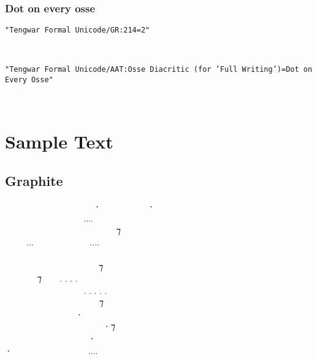 \documentclass[11pt,a4paper]{article}
\begin{document}
\formalAATosseambiguous  



\subsubsection*{Dot on every osse}


\texttt{"Tengwar Formal Unicode/GR:214=2"}

\formalGRosseevery  

\noindent \texttt{"Tengwar Formal Unicode/AAT:Osse Diacritic (for 'Full Writing')=Dot on Every Osse"}

\formalAATosseevery  



\newpage



\section{Sample Text}


\subsection{Graphite}
\formalGR
  ‍   ⸱‍  ‍ ⸱ \\
    ‍....  ‍  \\
  ‍   ‍ ‍ ⁊ ‍  \\
...  ....   \\
         ‍ \\
 ‍ ‍‍   ⁊  ‍ ‍ \\
 ‍ ⁊  . . . .  ‍ ‍‍   \\
   ‍ . . . . . ‍ ‍   \\
      ⁊    \\
   ‍⸱‍   ‍  \\
     ‍⸱ ⁊  ‍ \\
    ⸱    \\
⸱  ‍  .... ‍‍    \\
\end{document}
